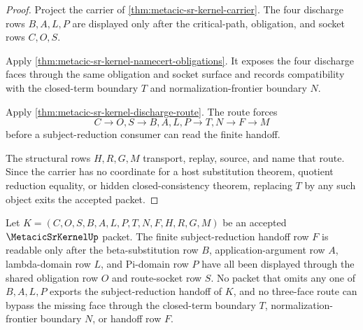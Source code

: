 \begin{proof}
Project the carrier of \autoref{thm:metacic-sr-kernel-carrier}. The four discharge rows $B,A,L,P$ are displayed only after the critical-path, obligation, and socket rows $C,O,S$.

Apply \autoref{thm:metacic-sr-kernel-namecert-obligations}. It exposes the four discharge faces through the same obligation and socket surface and records compatibility with the closed-term boundary $T$ and normalization-frontier boundary $N$.

Apply \autoref{thm:metacic-sr-kernel-discharge-route}. The route forces
$$
C \longrightarrow O,S \longrightarrow B,A,L,P \longrightarrow T,N \longrightarrow F \longrightarrow M
$$
before a subject-reduction consumer can read the finite handoff.

The structural rows $H,R,G,M$ transport, replay, source, and name that route. Since the carrier has no coordinate for a host substitution theorem, quotient reduction equality, or hidden closed-consistency theorem, replacing $T$ by any such object exits the accepted packet.
\end{proof}

\begin{theorem}\label{thm:metacic-sr-kernel-four-face-totality}
Let $K=(C,O,S,B,A,L,P,T,N,F,H,R,G,M)$ be an accepted $\MetacicSrKernelUp$ packet. The finite subject-reduction handoff row $F$ is readable only after the beta-substitution row $B$, application-argument row $A$, lambda-domain row $L$, and Pi-domain row $P$ have all been displayed through the shared obligation row $O$ and route-socket row $S$. No packet that omits any one of $B,A,L,P$ exports the subject-reduction handoff of $K$, and no three-face route can bypass the missing face through the closed-term boundary $T$, normalization-frontier boundary $N$, or handoff row $F$.
\end{theorem}

